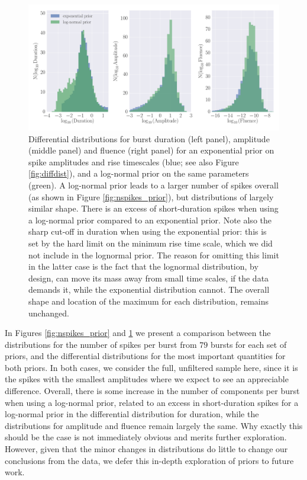 \documentclass[12pt]{emulateapj}
\begin{document}
\begin{figure}[htbp]
\begin{center}
\includegraphics[width=\textwidth]{f10.pdf}%
\caption{Differential distributions for burst duration (left panel), amplitude (middle panel) and fluence (right panel) for an exponential prior on spike 
amplitudes and rise timescales (blue; see also Figure \ref{fig:diffdist}),
and a log-normal prior on the same parameters (green). A log-normal prior leads to a larger number of spikes overall (as shown in Figure \ref{fig:nspikes_prior}), but distributions of largely
similar shape. There is an excess of short-duration spikes when using a log-normal prior compared to an exponential prior. Note also the sharp cut-off in duration when using the exponential prior: this is set by the hard limit on the minimum rise time scale, which we did not include in the lognormal prior. The reason for omitting this limit in the latter case is the fact that the lognormal distribution, by design, can move its mass away from small time scales, if the data demands it, while the exponential distribution cannot. The overall shape and location of the maximum for each distribution, remains unchanged.}
\label{fig:diff_prior}
\end{center}
\end{figure}

In Figures \ref{fig:nspikes_prior} and \ref{fig:diff_prior} we present a comparison between the distributions for the number of spikes 
per burst from $79$ bursts for each set of priors, and the differential distributions for the most important quantities for both priors.
In both cases, we consider the full, unfiltered sample here, since it is the spikes with the smallest amplitudes where we expect to see
an appreciable difference. Overall, there is some increase in the number of components per burst when using a log-normal prior, related to
an excess in short-duration spikes for a log-normal prior in the differential 
distribution for duration, while the distributions for amplitude and fluence remain largely the same. Why exactly this should be the case is not immediately 
obvious and merits further exploration. However, given that the minor changes in distributions do little to change our conclusions from the data, we defer this in-depth exploration of priors to future work.
\end{document}
